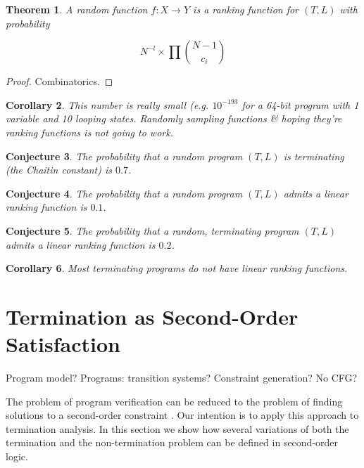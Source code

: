 \documentclass[preprint]{sigplanconf}
\newtheorem{theorem}{Theorem}
\newtheorem{corollary}[theorem]{Corollary}
\newtheorem{conjecture}[theorem]{Conjecture}
\theoremstyle{definition}
\begin{document}
\begin{theorem}
 A random function $f : X \to Y$ is a ranking function for $(T, L)$ with probability

 $$N^{-l} \times \prod {{N-1} \choose c_i}$$
\end{theorem}

\begin{proof}
 Combinatorics.
\end{proof}


\begin{corollary}
 This number is really small (e.g. $10^{-193}$ for a 64-bit program with 1 variable and 10 looping states.
 Randomly sampling functions \& hoping they're ranking functions is not going to work.
\end{corollary}


\begin{conjecture}
 The probability that a random program $(T, L)$ is terminating (the Chaitin constant)
 is $0.7$.
\end{conjecture}

\begin{conjecture}
 The probability that a random program $(T, L)$ admits a linear ranking function is
 $0.1$.
\end{conjecture}

\begin{conjecture}
 The probability that a random, terminating program $(T, L)$ admits a linear ranking function
 is $0.2$.
\end{conjecture}


\begin{corollary}
 Most terminating programs do not have linear ranking functions.
\end{corollary}
\fi


\section{Termination as Second-Order Satisfaction} \label{sec:second.order}
Program model? Programs: transition systems? Constraint generation? No CFG?



The problem of program verification can be reduced to the problem
of finding solutions to a second-order constraint \cite{DBLP:conf/pldi/GrebenshchikovLPR12,DBLP:conf/pldi/GulwaniSV08}. 
Our intention is to apply this approach to termination analysis. 
In this section we show how several variations of both the termination and the non-termination problem can be defined in second-order logic.  
\end{document}
